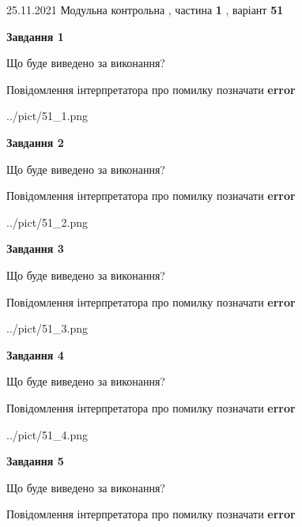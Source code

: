 \documentclass[10pt, ukrainian]{article}
\begin{document}
{25.11.2021 Модульна контрольна , частина \textbf { 1 }, варіант  \No \textbf { 51 }\par}
{
\begin {large}

{\begin {center}\textbf{Завдання 1}\end {center}}\par
Що буде виведено за виконання? \par
Повідомлення інтерпретатора про помилку позначати \textbf{error}

\begin{center}
	{../pict/51_1.png}
\end{center}
\newpage

{\begin {center}\textbf{Завдання 2}\end {center}}\par
Що буде виведено за виконання? \par
Повідомлення інтерпретатора про помилку позначати \textbf{error}

\begin{center}
	{../pict/51_2.png}
\end{center}
\newpage

{\begin {center}\textbf{Завдання 3}\end {center}}\par
Що буде виведено за виконання? \par
Повідомлення інтерпретатора про помилку позначати \textbf{error}

\begin{center}
	{../pict/51_3.png}
\end{center}
\newpage

{\begin {center}\textbf{Завдання 4}\end {center}}\par
Що буде виведено за виконання? \par
Повідомлення інтерпретатора про помилку позначати \textbf{error}

\begin{center}
	{../pict/51_4.png}
\end{center}
\newpage

{\begin {center}\textbf{Завдання 5}\end {center}}\par
Що буде виведено за виконання? \par
Повідомлення інтерпретатора про помилку позначати \textbf{error}


\end{large}}
\end{document}
